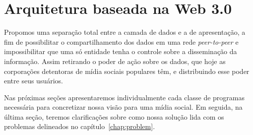 \begin{table}[H]
\begin{center}
\caption{\label{tab:tab1}Tabela Comparativa das Redes Sociais}
\setlength{\tabcolsep}{.25cm}
\end{center}
\end{table}

\chapter{Arquitetura baseada na Web 3.0}

Propomos uma separação total entre a camada de dados e a de apresentação, a fim de possibilitar o compartilhamento dos dados em uma rede \textit{peer-to-peer} e impossibilitar que uma só entidade tenha o controle sobre a disseminação da informação.
Assim retirando o poder de ação sobre os dados, que hoje as corporações detentoras de mídia sociais populares têm, e distribuindo esse poder entre seus usuários.

Nas próximas seções apresentaremos individualmente cada classe de programas necessária para concretizar nossa visão para uma mídia social. Em seguida, na última seção, teremos clarificações sobre como nossa solução lida com os problemas delineados no capítulo~\ref{chap:problem}. 

